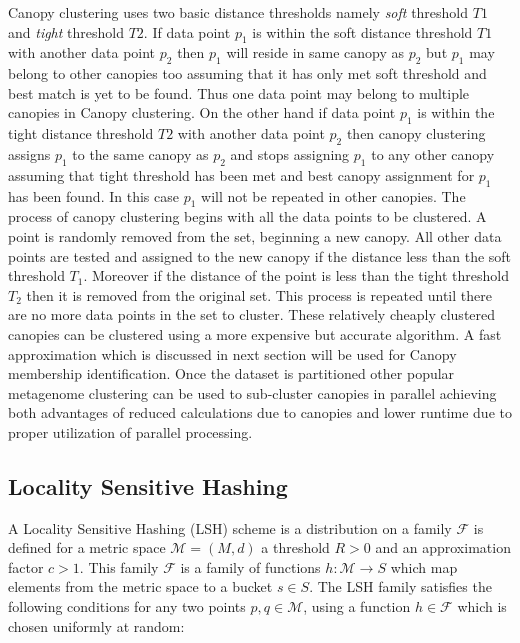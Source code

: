 \documentclass[10pt, conference, compsocconf]{IEEEtran}
\begin{document}
Canopy clustering uses two basic distance thresholds namely \textit{soft} threshold $T1$ and \textit{tight} threshold $T2$. If data point $p_1$ is within the soft distance threshold $T1$ with another data point $p_2$ then $p_1$ will reside in same canopy as $p_2$ but $p_1$ may belong to other canopies too assuming that it has only met soft threshold and best match is yet to be found. Thus one data point may belong to multiple canopies in Canopy clustering. On the other hand if data point $p_1$ is within the tight distance threshold $T2$ with another data point $p_2$ then canopy clustering assigns $p_1$ to the same canopy as $p_2$ and stops assigning $p_1$ to any other canopy assuming that tight threshold has been met and best canopy assignment for $p_1$ has been found. In this case $p_1$ will not be repeated in other canopies.
The process of canopy clustering begins with all the data points to be clustered. A point is randomly removed from the set, beginning a new canopy. All other data points are tested and assigned to the new canopy if the distance less than the soft threshold ${\displaystyle T_{1}}$. Moreover if the distance of the point is less than the tight threshold ${\displaystyle T_{2}}$ then it is removed from the original set. This process is repeated until there are no more data points in the set to cluster. These relatively cheaply clustered canopies can be clustered using a more expensive but accurate algorithm. A fast approximation which is discussed in next section will be used for Canopy membership identification. Once the dataset is partitioned other popular metagenome clustering can be used to sub-cluster canopies in parallel achieving both advantages of reduced calculations due to canopies and lower runtime due to proper utilization of parallel processing. 


\subsection{Locality Sensitive Hashing}

A Locality Sensitive Hashing (LSH) \cite{MARLshRef1}\cite{MARLshRef2}\cite{MARLshRef3} scheme is a distribution on a family ${\displaystyle {\mathcal {F}}}$ is defined for a metric space ${\displaystyle {\mathcal{M}}=(M,d)}$ a threshold ${\displaystyle R>0}$ and an approximation factor ${\displaystyle c>1}$. This family ${\displaystyle {\mathcal {F}}}$ is a family of functions ${\displaystyle h:{\mathcal {M}}\to S}$ which map elements from the metric space to a bucket ${\displaystyle s\in S}$. The LSH family satisfies the following conditions for any two points ${\displaystyle p,q\in {\mathcal {M}}}$, using a function ${\displaystyle h\in {\mathcal {F}}}$ which is chosen uniformly at random:
\end{document}
